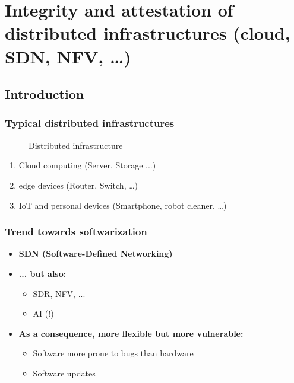 \chapter{Integrity and attestation of distributed infrastructures (cloud, SDN, NFV, …)}

\section{Introduction}

\subsection{Typical distributed infrastructures}

\begin{figure}[h]
    \centering
    \caption{Distributed infrastructure}
    \label{fig:distributed_infrastructure}
\end{figure}


\begin{enumerate}[itemsep=0pt]
    \item Cloud computing (Server, Storage ...)
    \item edge devices (Router, Switch, \dots)
    \item IoT and personal devices (Smartphone, robot cleaner,  \dots)
\end{enumerate}

\subsection{Trend towards softwarization}
\begin{itemize}[itemsep=0pt]
    \item \textbf{SDN (Software-Defined Networking)}
    \item \textbf{... but also:}
    \begin{itemize}[itemsep=0pt]
        \item SDR, NFV, ...
        \item AI (!)
    \end{itemize}
    \item \textbf{As a consequence, more flexible but more vulnerable:}
    \begin{itemize}[itemsep=0pt]
        \item Software more prone to bugs than hardware
        \item Software updates
    \end{itemize}
\end{itemize}

